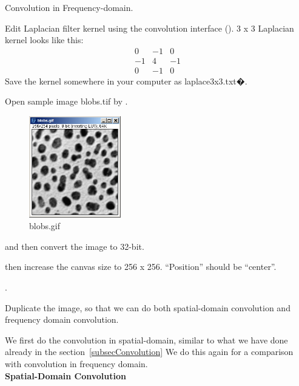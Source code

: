 \begin{indentexercise}{1} Convolution in Frequency-domain.

Edit Laplacian filter kernel using the convolution interface
(). 3 x 3 Laplacian kernel looks like
this:
\[
\begin{matrix}
0 & -1 & 0\\
-1 & 4 & -1\\
0 & -1 & 0
\end{matrix}
\]
Save the kernel somewhere in your computer as laplace3x3.txt�.

Open sample image blobs.tif by
.
\begin{figure}[htbp]
\begin{center}
\includegraphics[width=4cm]{fig/fig1_3_fftconvolv1.png}
\caption{ blobs.gif}
\label{fig:fftconv1}
\end{center}
\end{figure}
and then convert the image to 32-bit.


then increase the canvas size to 256 x 256. ``Position'' should be ``center''.

. 

Duplicate the image, so that we can do both spatial-domain convolution and
frequency domain convolution. 

We first do the convolution in spatial-domain, similar to what we
have done already in the section~\ref{subsecConvolution} We do this again for
a comparison with convolution in frequency domain.\\

\textbf{Spatial-Domain Convolution}



\end{indentexercise}
